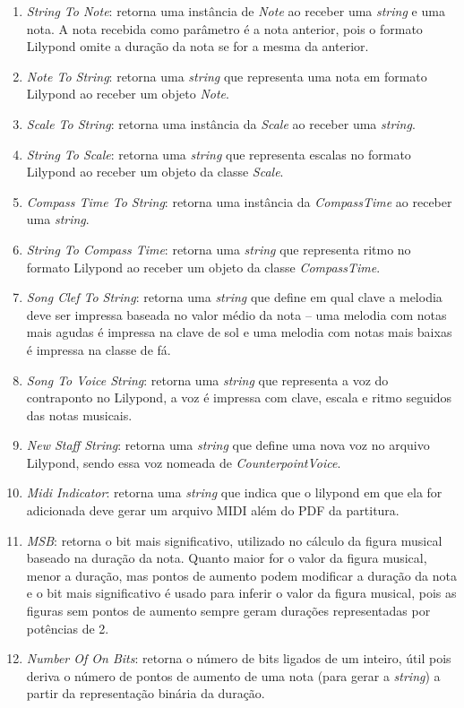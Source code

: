       \begin{enumerate}
        \item \textit{String To Note}: retorna uma instância de \textit{Note} ao receber uma \textit{string} e uma nota. A nota recebida como parâmetro é a nota anterior, pois o formato Lilypond omite a duração da nota se for a mesma da anterior.
        \item \textit{Note To String}: retorna uma \textit{string} que representa uma nota em formato Lilypond ao receber um objeto \textit{Note}.
        \item \textit{Scale To String}: retorna uma instância da \textit{Scale} ao receber uma \textit{string}.
        \item \textit{String To Scale}: retorna uma \textit{string} que representa escalas no formato Lilypond ao receber um objeto da classe \textit{Scale}.
        \item \textit{Compass Time To String}: retorna uma instância da \textit{CompassTime} ao receber uma \textit{string}.
        \item \textit{String To Compass Time}: retorna uma \textit{string} que representa ritmo no formato Lilypond ao receber um objeto da classe \textit{CompassTime}.
        \item \textit{Song Clef To String}: retorna uma \textit{string} que define em qual clave a melodia deve ser impressa baseada no valor médio da nota -- uma melodia com notas mais agudas é impressa na clave de sol e uma melodia com notas mais baixas é impressa na classe de fá.
        \item \textit{Song To Voice String}: retorna uma \textit{string} que representa a voz do contraponto no Lilypond, a voz é impressa com clave, escala e ritmo seguidos das notas musicais.
        \item \textit{New Staff String}: retorna uma \textit{string} que define uma nova voz no arquivo Lilypond, sendo essa voz nomeada de \textit{CounterpointVoice}.
        \item \textit{Midi Indicator}: retorna uma \textit{string} que indica que o lilypond em que ela for adicionada deve gerar um arquivo MIDI além do PDF da partitura.
        \item \textit{MSB}: retorna o bit mais significativo, utilizado no cálculo da figura musical baseado na duração da nota. Quanto maior for o valor da figura musical, menor a duração, mas pontos de aumento podem modificar a duração da nota e o bit mais significativo é usado para inferir o valor da figura musical, pois as figuras sem pontos de aumento sempre geram durações representadas por potências de 2.
        \item \textit{Number Of On Bits}: retorna o número de bits ligados de um inteiro, útil pois deriva o número de pontos de aumento de uma nota (para gerar a \textit{string}) a partir da representação binária da duração.
      \end{enumerate}

